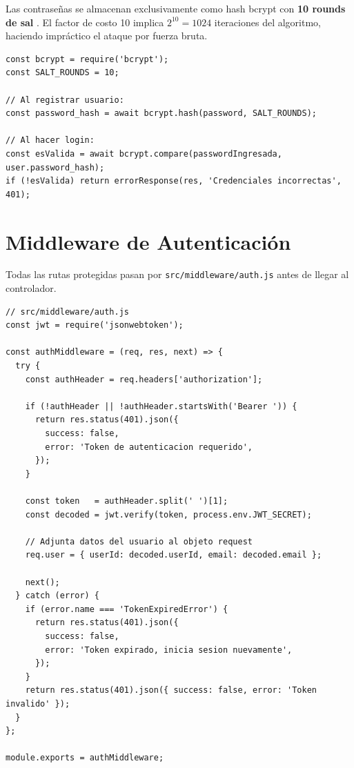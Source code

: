 Las contraseñas se almacenan exclusivamente como hash bcrypt con \textbf{10 rounds de sal} \cite{bcrypt_npm}. El factor de costo 10 implica $2^{10} = 1024$ iteraciones del algoritmo, haciendo impráctico el ataque por fuerza bruta.

\begin{lstlisting}[style=javascript, caption={Hash y verificación de contraseña con bcrypt}]
const bcrypt = require('bcrypt');
const SALT_ROUNDS = 10;

// Al registrar usuario:
const password_hash = await bcrypt.hash(password, SALT_ROUNDS);

// Al hacer login:
const esValida = await bcrypt.compare(passwordIngresada, user.password_hash);
if (!esValida) return errorResponse(res, 'Credenciales incorrectas', 401);
\end{lstlisting}

\section{Middleware de Autenticación}

Todas las rutas protegidas pasan por \texttt{src/middleware/auth.js} antes de llegar al controlador.

\begin{lstlisting}[style=javascript, caption={Middleware de autenticación JWT completo}]
// src/middleware/auth.js
const jwt = require('jsonwebtoken');

const authMiddleware = (req, res, next) => {
  try {
    const authHeader = req.headers['authorization'];

    if (!authHeader || !authHeader.startsWith('Bearer ')) {
      return res.status(401).json({
        success: false,
        error: 'Token de autenticacion requerido',
      });
    }

    const token   = authHeader.split(' ')[1];
    const decoded = jwt.verify(token, process.env.JWT_SECRET);

    // Adjunta datos del usuario al objeto request
    req.user = { userId: decoded.userId, email: decoded.email };

    next();
  } catch (error) {
    if (error.name === 'TokenExpiredError') {
      return res.status(401).json({
        success: false,
        error: 'Token expirado, inicia sesion nuevamente',
      });
    }
    return res.status(401).json({ success: false, error: 'Token invalido' });
  }
};

module.exports = authMiddleware;
\end{lstlisting}

